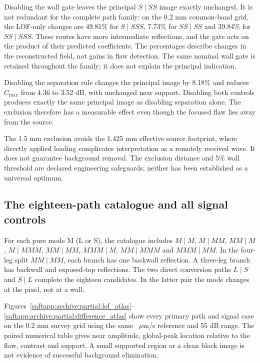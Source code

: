 Disabling the wall gate leaves the principal $S\mid SS$ image exactly unchanged. It is not redundant for the complete path family: on the 0.2 mm common-band grid, the LOF-only changes are 49.81\% for $S\mid SSS$, 7.73\% for $SS\mid SS$ and 39.84\% for $SS\mid SSS$. These routes have more intermediate reflections, and the gate acts on the product of their predicted coefficients. The percentages describe changes in the reconstructed field, not gains in flaw detection. The same nominal wall gate is retained throughout the family; it does not explain the principal indication.

Disabling the separation rule changes the principal image by 8.18\% and reduces $C_{\max}$ from 4.36 to 3.52 dB, with unchanged near support. Disabling both controls produces exactly the same principal image as disabling separation alone. The exclusion therefore has a measurable effect even though the focused flaw lies away from the source.

The 1.5 mm exclusion avoids the 1.425 mm effective source footprint, where directly applied loading complicates interpretation as a remotely received wave. It does not guarantee background removal. The exclusion distance and 5\% wall threshold are declared engineering safeguards; neither has been established as a universal optimum.

\subsection{The eighteen-path catalogue and all signal controls}\label{saftapp:archive:partial:catalogue}
For each pure mode M (L or S), the catalogue includes $M\mid M$, $M\mid MM$, $MM\mid M$, $M\mid MMM$, $MM\mid MM$, $MMM\mid M$, $MM\mid MMM$ and $MMM\mid MM$. In the four-leg split $MM\mid MM$, each branch has one backwall reflection. A three-leg branch has backwall and exposed-top reflections. The two direct conversion paths $L\mid S$ and $S\mid L$ complete the eighteen candidates. In the latter pair the mode changes at the pixel, not at a wall.

Figures~\ref{saftapp:archive:partial:lof_atlas}--\ref{saftapp:archive:partial:difference_atlas} show every primary path and signal case on the 0.2 mm survey grid using the same \saftappPartialDisplayReference\ $\mu$m/s reference and 55 dB range. The paired numerical table gives near amplitude, global-peak location relative to the flaw, contrast and support. A small supported region or a clean black image is not evidence of successful background elimination.

